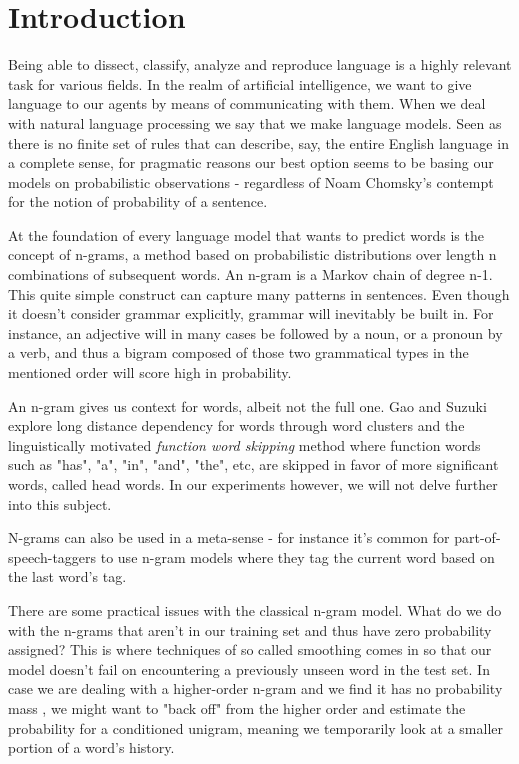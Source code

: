 \documentclass[a4paper,12pt]{article}
\begin{document}
\section{Introduction}
\label{sec:intro}

Being able to dissect, classify, analyze and reproduce language is a highly relevant task for various fields. In the realm of artificial intelligence, we want to give language to our agents by means of communicating with them. When we deal with natural language processing we say that we make language models. Seen as there is no finite set of rules that can describe, say, the entire English language in a complete sense, for pragmatic reasons our best option seems to be basing our models on probabilistic observations - regardless of Noam Chomsky's contempt\cite{JurafskyBook} for the notion of probability of a sentence.

At the foundation of every language model that wants to predict words is the concept of n-grams, a method based on probabilistic distributions over length n combinations of subsequent words. An n-gram is a Markov chain of degree n-1. This quite simple construct can capture many patterns in sentences. Even though it doesn't consider grammar explicitly, grammar will inevitably be built in. For instance, an adjective will in many cases be followed by a noun, or a pronoun by a verb, and thus a bigram composed of those two grammatical types in the mentioned order will score high in probability. 

An n-gram gives us context for words, albeit not the full one. Gao and Suzuki\cite{gao2004long} explore long distance dependency for words through word clusters and the linguistically motivated {\it function word skipping} method where function words such as "has", "a", "in", "and", "the", etc, are skipped in favor of more significant words, called head words. In our experiments however, we will not delve further into this subject.

N-grams can also be used in a meta-sense - for instance it's common for part-of-speech-taggers to use n-gram models where they tag the current word based on the last word's tag.

There are some practical issues with the classical n-gram model. What do we do with the n-grams that aren't in our training set and thus have zero probability assigned? This is where techniques of so called smoothing comes in so that our model doesn't fail on encountering a previously unseen word in the test set. In case we are dealing with a higher-order n-gram and we find it has no probability mass , we might want to "back off" from the higher order and estimate the probability for a conditioned unigram, meaning we temporarily look at a smaller portion of a word's history.
\end{document}
